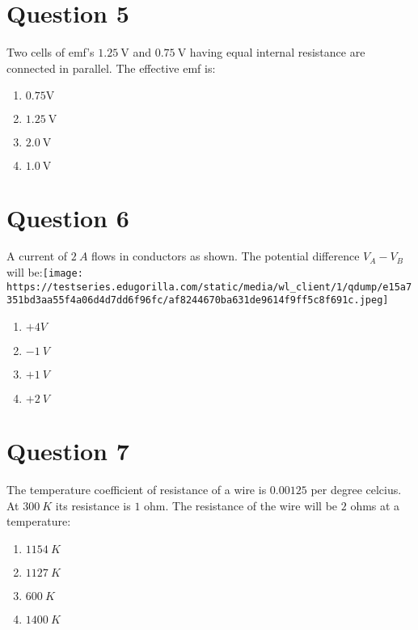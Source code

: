 \documentclass{article}
\begin{document}
\section*{Question 5}
Two cells of emf's \(1.25 \mathrm{~V}\) and \(0.75 \mathrm{~V}\) having equal internal resistance are connected in parallel. The effective emf is:
\begin{enumerate}[label=(\alph*)]
\item \(0.75{\mathrm{V}}\)
\item \(1.25 \mathrm{~V}\)
\item \(2.0 \mathrm{~V}\)
\item \(1.0 \mathrm{~V}\)
\end{enumerate}
\newpage
\section*{Question 6}
A current of \(2~ A\) flows in conductors as shown. The potential difference \(V_A-V_B\) will be:\newline\texttt{[image: https://testseries.edugorilla.com/static/media/wl\_client/1/qdump/e15a7351bd3aa55f4a06d4d7dd6f96fc/af8244670ba631de9614f9ff5c8f691c.jpeg]}
\begin{enumerate}[label=(\alph*)]
\item \(+4 V\)
\item \(-1 {~V}\)
\item \(+1 {~V}\)
\item \(+2 {~V}\)
\end{enumerate}
\newpage
\section*{Question 7}
The temperature coefficient of resistance of a wire is \(0.00125\) per degree celcius. At \(300 {~K}\) its resistance is \(1\) ohm. The resistance of the wire will be \(2\) ohms at a temperature:
\begin{enumerate}[label=(\alph*)]
\item \(1154 {~K}\)
\item \(1127 {~K}\)
\item \(600~ K\)
\item \(1400 {~K}\)
\end{enumerate}
\newpage
\end{document}
